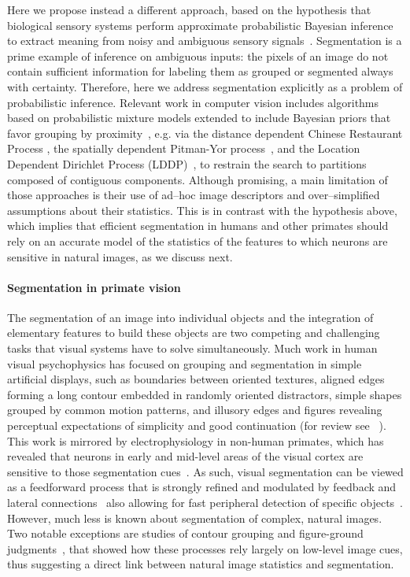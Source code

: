 \documentclass[a4paper,12pt]{article}
\begin{document}
Here we propose instead a different approach, based on the hypothesis that biological sensory systems perform approximate probabilistic Bayesian inference to extract meaning from noisy and ambiguous sensory signals~\cite{pouget2013probabilistic,knill1996perception,knill2004bayesian,dayan2001theoretical,kersten2004object}. Segmentation is a prime example of inference on ambiguous inputs: the pixels of an image do not contain sufficient information for labeling them as grouped or segmented always with certainty. Therefore, here we address segmentation explicitly as a problem of probabilistic inference. Relevant work in computer vision includes algorithms based on probabilistic mixture models extended to include Bayesian priors that favor grouping by proximity~\cite{nikou2010bayesian}, e.g. via the distance dependent Chinese Restaurant Process \cite{ghosh2011spatial}, the spatially dependent Pitman-Yor process~\cite{sudderth2009shared}, and the Location Dependent Dirichlet Process (LDDP)~\cite{sun2017location}, to restrain the search to partitions composed of contiguous components. Although promising, a main limitation of those approaches is their use of ad--hoc image descriptors and over--simplified assumptions about their statistics. This is in contrast with the hypothesis above, which implies that efficient segmentation in humans and other primates should rely on an accurate model of the statistics of the features to which neurons are sensitive in natural images, as we discuss next. 
 
\paragraph{Segmentation in primate vision} The segmentation of an image into individual objects and the integration of elementary features to build these objects are two competing and challenging tasks that visual systems have to solve simultaneously. Much work in human visual psychophysics has focused on grouping and segmentation in simple artificial displays, such as boundaries between oriented textures, aligned edges forming a long contour embedded in randomly oriented distractors, simple shapes grouped by common motion patterns, and illusory edges and figures revealing perceptual expectations of simplicity and good continuation (for review see ~\cite{wagemans2012century}). This work is mirrored by electrophysiology in non-human primates, which has revealed that neurons in early and mid-level areas of the visual cortex are sensitive to those segmentation cues~\cite{roelfsema2006cortical,slllito1995visual,cavanaugh2002nature,li2006contour,pasupathy2015neural}. As such, visual segmentation can be viewed as a feedforward process that is strongly refined and modulated by feedback and lateral connections~\cite{neri2017object,li1999contextual} also allowing for fast peripheral detection of specific objects~\cite{boucart2016finding}. However, much less is known about segmentation of complex, natural images. Two notable exceptions are studies of contour grouping \cite{geisler2009contour,sigman2001common} and figure-ground judgments~\cite{fowlkes2007local}, that showed how these processes rely largely on low-level image cues, thus suggesting a direct link between natural image statistics and segmentation.
\end{document}
